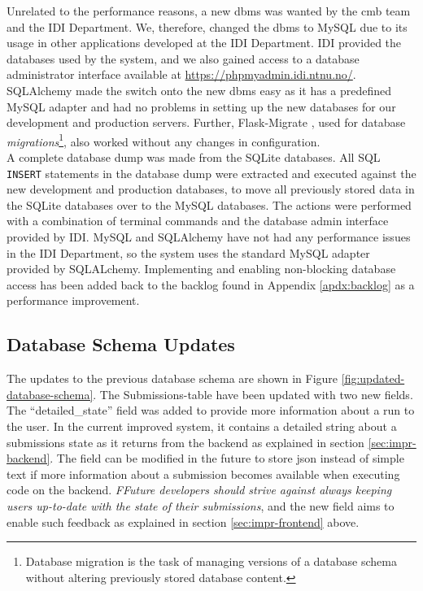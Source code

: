 Unrelated to the performance reasons, a new \gls{dbms} was wanted by the \gls{cmb} team and the IDI Department. We, therefore, changed the \gls{dbms} to MySQL due to its usage in other applications developed at the IDI Department. IDI provided the databases used by the system, and we also gained access to a database administrator interface available at \url{https://phpmyadmin.idi.ntnu.no/}. SQLAlchemy made the switch onto the new \gls{dbms} easy as it has a predefined MySQL adapter and had no problems in setting up the new databases for our development and production servers. Further, Flask-Migrate \cite{FLASKMIGRATE}, used for database \textit{migrations}\footnote{Database migration is the task of managing versions of a database schema without altering previously stored database content.}, also worked without any changes in configuration. \\

A complete database dump was made from the SQLite databases. All SQL \texttt{INSERT} statements in the database dump were extracted and executed against the new development and production databases, to move all previously stored data in the SQLite databases over to the MySQL databases. The actions were performed with a combination of terminal commands and the database admin interface provided by IDI. MySQL and SQLAlchemy have not had any performance issues in the IDI Department, so the system uses the standard MySQL adapter provided by SQLALchemy. Implementing and enabling non-blocking database access has been added back to the backlog found in Appendix \ref{apdx:backlog} as a performance improvement.

\subsection{Database Schema Updates}
\label{subsec:impr-database}
The updates to the previous database schema are shown in Figure \ref{fig:updated-database-schema}. The Submissions-table have been updated with two new fields. The ``detailed\_state'' field was added to provide more information about a run to the user. In the current improved system, it contains a detailed string about a submissions state as it returns from the backend as explained in section \ref{sec:impr-backend}. The field can be modified in the future to store \gls{json} instead of simple text if more information about a submission becomes available when executing code on the backend. \textit{FFuture developers should strive against always keeping users up-to-date with the state of their submissions}, and the new field aims to enable such feedback as explained in section \ref{sec:impr-frontend} above. \\

